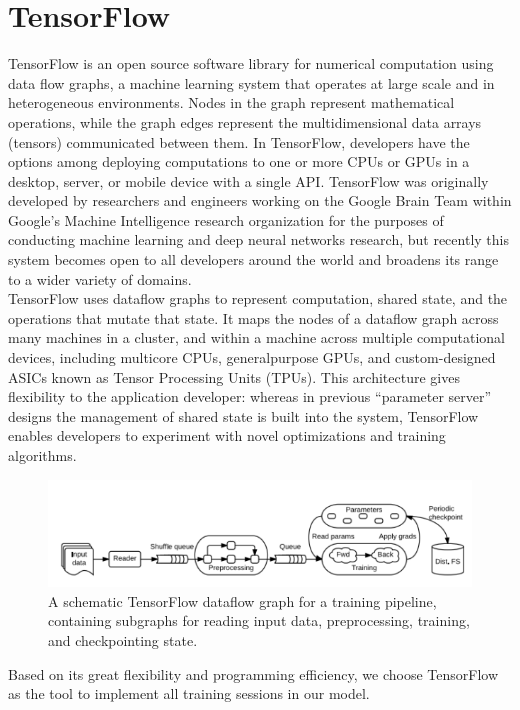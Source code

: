 \documentclass[12pt]{report} %
\begin{document}
\section{TensorFlow}
TensorFlow is an open source software library for numerical computation using data flow graphs, a machine learning system that operates at large scale and in heterogeneous environments. Nodes in the graph represent mathematical operations, while the graph edges represent the multidimensional data arrays (tensors) communicated between them. In TensorFlow, developers have the options among deploying computations to one or more CPUs or GPUs in a desktop, server, or mobile device with a single API. TensorFlow was originally developed by researchers and engineers working on the Google Brain Team within Google's Machine Intelligence research organization for the purposes of conducting machine learning and deep neural networks research, but recently this system becomes open to all developers around the world and broadens its range to a wider variety of domains\cite{TF2}.\\
TensorFlow uses dataflow graphs to represent computation, shared state, and the operations that mutate that state. It maps the nodes of a dataflow graph across many machines in a cluster, and within a machine across multiple computational devices, including multicore CPUs, generalpurpose GPUs, and custom-designed ASICs known as Tensor Processing Units (TPUs). This architecture gives flexibility to the application developer: whereas in previous “parameter server” designs the management of shared state is built into the system, TensorFlow enables developers to experiment with novel optimizations and training algorithms\cite{TF}. \\
\begin{figure}[H]
	\centering
	\includegraphics[scale=1.0]{pictures/tensorflow.png}
	\caption{A schematic TensorFlow dataflow graph for a training pipeline, containing subgraphs for reading input data, preprocessing, training, and checkpointing state\cite{TFPIC}.}
	\label{fig:5}
\end{figure}
Based on its great flexibility and programming efficiency, we choose TensorFlow as the tool to implement all training sessions in our model. 
\end{document}
